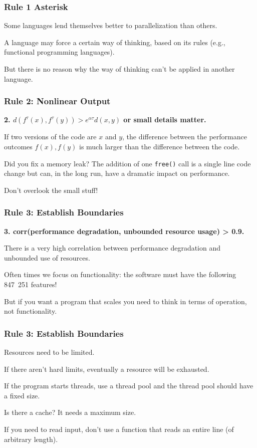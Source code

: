 \begin{frame}
\frametitle{Rule 1 Asterisk}

Some languages lend themselves better to parallelization than others. 

A language may force a certain way of thinking, based on its rules (e.g., functional programming languages). 

But there is no reason why the way of thinking can't be applied in another language.


\end{frame}



\begin{frame}
\frametitle{Rule 2: Nonlinear Output}

\textbf{2. $d(f^{\tau}(x), f^{\tau}(y)) > e^{\alpha\tau} d(x, y)$ or small details matter.}

If two versions of the code are $x$ and $y$, the difference between the performance outcomes $f(x), f(y)$ is much larger than the difference between the code.

Did you fix a memory leak? The addition of one \texttt{free()} call is a single line code change but can, in the long run, have a dramatic impact on performance. 

Don't overlook the small stuff!

\end{frame}




\begin{frame}
\frametitle{Rule 3: Establish Boundaries}

\textbf{3. corr(performance degradation, unbounded resource usage) > 0.9.}

There is a very high correlation between performance degradation and unbounded use of resources. 

Often times we focus on functionality: the software must have the following 847~251 features! 

But if you want a program that scales you need to think in terms of operation, not functionality.

\end{frame}



\begin{frame}
\frametitle{Rule 3: Establish Boundaries}

Resources need to be limited. 

If there aren't hard limits, eventually a resource will be exhausted. 

If the program starts threads, use a thread pool and the thread pool should have a fixed size. 

Is there a cache? It needs a maximum size. 

If you need to read input, don't use a function that reads an entire line (of arbitrary length). 

\end{frame}



